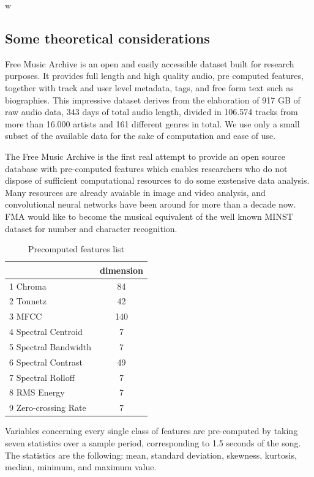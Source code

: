 w\documentclass[11pt, oneside]{article}
\begin{document}
\subsection{Some theoretical considerations}

Free Music Archive is an open and easily accessible dataset built for research purposes. It provides full length and high quality audio, pre computed features, together with track and user level metadata, tags, and free form text such as biographies. This impressive dataset derives from the elaboration of 917 GB of raw audio data, 343 days of total audio length, divided in 106.574 tracks from more than 16.000 artists and 161 different genres in total. We use only a small subset of the available data for the sake of computation and ease of use.

The Free Music Archive is the first real attempt to provide an open source database with pre-computed features which enables researchers who do not dispose of sufficient computational resources to do some exstensive data analysis. Many resources are already avaiable in image and video analysis, and convolutional neural networks have been around for more than a decade now. FMA would like to become the musical equivalent of the well known MINST dataset for number and character recognition. 

\begin{table}
\begin{tabular}{lc}
\hline
 & dimension \\ \hline
1 Chroma & 84 \\
2 Tonnetz & 42 \\
3 MFCC & 140 \\
4 Spectral Centroid & 7 \\
5 Spectral Bandwidth & 7 \\
6 Spectral Contrast & 49 \\
7 Spectral Rolloff & 7 \\
8 RMS Energy & 7 \\
9 Zero-crossing Rate & 7 \\ \hline
\end{tabular}
\caption{Precomputed features list}
\label{my-label}
\end{table}

Variables concerning every single class of features are pre-computed by taking seven statistics over a sample period, corresponding to 1.5 seconds of the song. The statistics are the following: mean, standard deviation, skewness, kurtosis, median, minimum, and maximum value.
\end{document}
